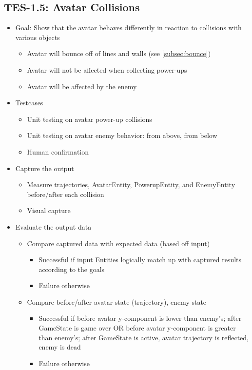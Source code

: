 \subsection{TES-1.5: Avatar Collisions}
\label{subsec:collisions}
\begin{itemize}
\item Goal: Show that the avatar behaves differently in reaction to collisions with various objects
\begin{itemize}
\item Avatar will bounce off of lines and walls (see \ref{subsec:bounce})
\item Avatar will not be affected when collecting power-ups
\item Avatar will be affected by the enemy
\end{itemize}

\item Testcases
\begin{itemize}
\item Unit testing on avatar power-up collisions
\item Unit testing on avatar enemy behavior: from above, from below
\item Human confirmation
\end{itemize}

\item Capture the output
\begin{itemize}
\item Measure trajectories, AvatarEntity, PowerupEntity, and EnemyEntity before/after each collision
\item Visual capture
\end{itemize}

\item Evaluate the output data
\begin{itemize}
\item Compare captured data with expected data (based off input)
\begin{itemize}
\item Successful if input Entities logically match up with captured results according to the goals
\item Failure otherwise
\end{itemize}
\item Compare before/after avatar state (trajectory), enemy state
\begin{itemize}
\item Successful if before avatar y-component is lower than enemy's; after GameState is game over OR before avatar y-component is greater than enemy's; after GameState is active, avatar trajectory is reflected, enemy is dead
\item Failure otherwise
\end{itemize}
\end{itemize}


\end{itemize}
